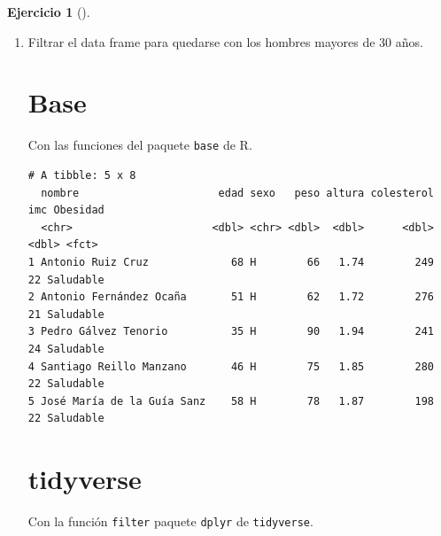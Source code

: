 \documentclass[
  spanish,
  a4paper,
]{scrreport}
\newenvironment{Shaded}{\begin{snugshade}}{\end{snugshade}}
\newcommand{\DecValTok}[1]{\textcolor[rgb]{0.68,0.00,0.00}{#1}}
\newcommand{\NormalTok}[1]{\textcolor[rgb]{0.00,0.23,0.31}{#1}}
\newcommand{\SpecialCharTok}[1]{\textcolor[rgb]{0.37,0.37,0.37}{#1}}
\newcommand{\StringTok}[1]{\textcolor[rgb]{0.13,0.47,0.30}{#1}}
\theoremstyle{definition}
\newtheorem{exercise}{Ejercicio}[chapter]
\theoremstyle{remark}
\begin{document}
\begin{exercise}[]
\begin{enumerate}
\begin{tcolorbox}
  \end{tcolorbox}
\item
  Filtrar el data frame para quedarse con los hombres mayores de 30
  años.

  \begin{tcolorbox}[enhanced jigsaw, titlerule=0mm, arc=.35mm, rightrule=.15mm, opacitybacktitle=0.6, leftrule=.75mm, colframe=quarto-callout-tip-color-frame, toptitle=1mm, breakable, colbacktitle=quarto-callout-tip-color!10!white, bottomrule=.15mm, colback=white, left=2mm, bottomtitle=1mm, opacityback=0, title=\textcolor{quarto-callout-tip-color}{\faLightbulb}\hspace{0.5em}{Solución}, toprule=.15mm, coltitle=black]

  \section{Base}

  Con las funciones del paquete \texttt{base} de R.

\begin{Shaded}
\end{Shaded}

\begin{verbatim}
# A tibble: 5 x 8
  nombre                      edad sexo   peso altura colesterol   imc Obesidad 
  <chr>                      <dbl> <chr> <dbl>  <dbl>      <dbl> <dbl> <fct>    
1 Antonio Ruiz Cruz             68 H        66   1.74        249    22 Saludable
2 Antonio Fernández Ocaña       51 H        62   1.72        276    21 Saludable
3 Pedro Gálvez Tenorio          35 H        90   1.94        241    24 Saludable
4 Santiago Reillo Manzano       46 H        75   1.85        280    22 Saludable
5 José María de la Guía Sanz    58 H        78   1.87        198    22 Saludable
\end{verbatim}

  \section{tidyverse}

  Con la función \texttt{filter} paquete \texttt{dplyr} de
  \texttt{tidyverse}.


\end{tcolorbox}
\end{enumerate}
\end{exercise}
\end{document}

